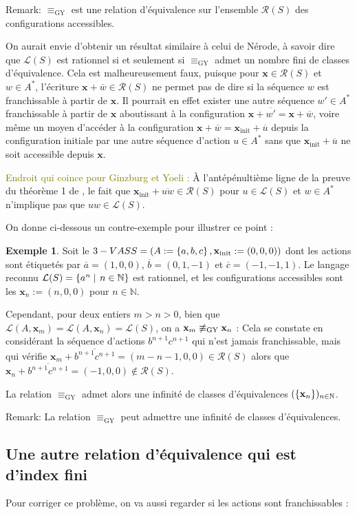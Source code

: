 \documentclass[a4paper,final]{article}
\theoremstyle{definition}
\newtheorem{Example}[Theorem]{Exemple}
\newcommand{\lucas}[1]{\textcolor{olive}{#1}}
\newcommand{\set}[2]{\left\{#1\mathrel{\left|\vphantom{#1}\vphantom{#2}\right.}#2\right\}}
\newcommand{\os}[1]{\left\{\mathinner{#1}\right\}}
\newcommand{\N}{\ensuremath{\mathbb{N}}}
\newcommand{\lang}{\ensuremath{\mathcal{L}}}
\newcommand{\conf}{\ensuremath{\mathcal{R}}}
\newcommand{\vect}[1]{\ensuremath{\mathbf{#1}}}
\newcommand{\relGY}{\ensuremath{\equiv_\text{GY}}}
\newcommand{\xinit}{\ensuremath{\vect{x}_\text{init}}}
\newcommand{\valeur}[1]{\ensuremath{\overline{#1}}}
\begin{document}
Remark: $\relGY$ est une relation d'équivalence sur l'ensemble $\conf(S)$ des configurations accessibles.

On aurait envie d'obtenir un résultat similaire à celui de Nérode, à savoir dire que $\lang(S)$ est rationnel si et seulement si $\relGY$ admet un nombre fini de classes d'équivalence.
Cela est malheureusement faux, puisque pour $\vect{x}\in\conf(S)$ et $w\in A^\ast$, l'écriture $\vect{x} +\valeur{w}\in\conf(S)$ ne permet pas de dire si la séquence $w$ est franchissable à partir de $\vect{x}$.
Il pourrait en effet exister une autre séquence $w'\in A^\ast$ franchissable à partir de $\vect{x}$ aboutissant à la configuration $\vect{x} +\valeur{w'} = \vect{x} +\valeur{w}$,
voire même un moyen d'accéder à la configuration $\vect{x} +\valeur{w} = \xinit +\valeur{u}$ depuis la configuration initiale par une autre séquence d'action $u\in A^\ast$ sans que $\xinit +\valeur{u}$ ne soit accessible depuis $\vect{x}$.

\lucas{Endroit qui coince pour Ginzburg et Yoeli :}
À l'antépénultième ligne de la preuve du théorème 1 de \cite{giyo80}, le fait que $\xinit +\valeur{uw}\in\conf(S)$ pour $u\in\lang(S)$ et $w\in A^\ast$ n'implique pas que $uw\in\lang(S)$.

On donne ci-dessous un contre-exemple pour illustrer ce point :

\begin{Example}
Soit le $3-VAS S = (A:=\os{a,b,c},\xinit:=(0,0,0))$ dont les actions sont étiquetés par $\valeur{a}=(1,0,0)$, $\valeur{b}=(0,1,-1)$ et $\valeur{c}=(-1,-1,1)$.
Le langage reconnu $\lang(S)=\set{a^n}{n\in\N}$ est rationnel, et les configurations accessibles sont les $\vect{x}_n:=(n,0,0)$ pour $n\in\N$.

Cependant, pour deux entiers $m>n>0$, bien que $\lang(A,\vect{x}_m) =\lang(A,\vect{x}_n) =\lang(S)$, on a $\vect{x}_m \not\relGY \vect{x}_n$ :
Cela se constate en considérant la séquence d'actions $b^{n+1}c^{n+1}$ qui n'est jamais franchissable, mais qui vérifie $\vect{x}_m +\valeur{b^{n+1}c^{n+1}} = (m-n-1,0,0)\in \conf(S)$ alors que $\vect{x}_n +\valeur{b^{n+1}c^{n+1}} = (-1,0,0)\notin \conf(S)$.

La relation $\relGY$ admet alors une infinité de classes d'équivalences $(\os{\vect{x}_n})_{n\in\N}$.
\end{Example}

Remark: La relation $\relGY$ peut admettre une infinité de classes d'équivalences.

\subsection{Une autre relation d'équivalence qui est d'index fini}
Pour corriger ce problème, on va aussi regarder si les actions sont franchissables :
\end{document}
